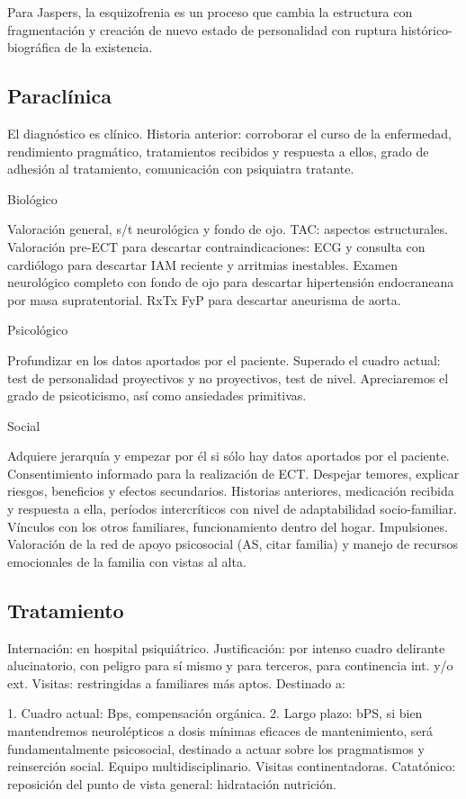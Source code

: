 Para Jaspers, la esquizofrenia es un proceso que cambia la estructura con fragmentación y creación de nuevo estado de personalidad con ruptura histórico-biográfica de la existencia.

\subsection*{Paraclínica}

El diagnóstico es clínico. Historia anterior: corroborar el curso de la enfermedad, rendimiento pragmático, tratamientos recibidos y respuesta a ellos, grado de adhesión al tratamiento, comunicación con psiquiatra tratante.

Biológico

Valoración general, s/t neurológica y fondo de ojo. TAC: aspectos estructurales. Valoración pre-ECT para descartar contraindicaciones: ECG y consulta con cardiólogo para descartar IAM reciente y arritmias inestables. Examen neurológico completo con fondo de ojo para descartar hipertensión endocraneana por masa supratentorial. RxTx FyP para descartar aneurisma de aorta.

Psicológico

Profundizar en los datos aportados por el paciente. Superado el cuadro actual: test de personalidad proyectivos y no proyectivos, test de nivel. Apreciaremos el grado de psicoticismo, así como ansiedades primitivas.

Social

Adquiere jerarquía y empezar por él si sólo hay datos aportados por el paciente. Consentimiento informado para la realización de ECT. Despejar temores, explicar riesgos, beneficios y efectos secundarios. Historias anteriores, medicación recibida y respuesta a ella, períodos intercríticos con nivel de adaptabilidad socio-familiar. Vínculos con los otros familiares, funcionamiento dentro del hogar. Impulsiones. Valoración de la red de apoyo psicosocial (AS, citar familia) y manejo de recursos emocionales de la familia con vistas al alta.
\subsection*{Tratamiento}
Internación: en hospital psiquiátrico. Justificación: por intenso cuadro delirante alucinatorio, con peligro para sí mismo y para terceros, para continencia int. y/o ext. Visitas: restringidas a familiares más aptos. Destinado a:

1. Cuadro actual: Bps, compensación orgánica. 2. Largo plazo: bPS, si bien mantendremos neurolépticos a dosis mínimas eficaces de mantenimiento, será fundamentalmente psicosocial, destinado a actuar sobre los pragmatismos y reinserción social. Equipo multidisciplinario. Visitas continentadoras. Catatónico: reposición del punto de vista general: hidratación nutrición.
